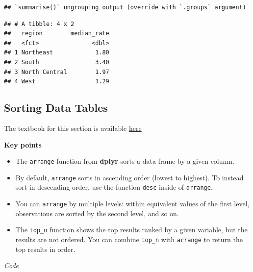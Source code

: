 \documentclass[
]{article}
\newenvironment{Shaded}{\begin{snugshade}}{\end{snugshade}}
\newcommand{\CommentTok}[1]{\textcolor[rgb]{0.56,0.35,0.01}{\textit{#1}}}
\newcommand{\DataTypeTok}[1]{\textcolor[rgb]{0.13,0.29,0.53}{#1}}
\newcommand{\DecValTok}[1]{\textcolor[rgb]{0.00,0.00,0.81}{#1}}
\newcommand{\KeywordTok}[1]{\textcolor[rgb]{0.13,0.29,0.53}{\textbf{#1}}}
\newcommand{\NormalTok}[1]{#1}
\newcommand{\OperatorTok}[1]{\textcolor[rgb]{0.81,0.36,0.00}{\textbf{#1}}}
\newcommand{\StringTok}[1]{\textcolor[rgb]{0.31,0.60,0.02}{#1}}
\providecommand{\tightlist}{%
  \setlength{\itemsep}{0pt}\setlength{\parskip}{0pt}}
\begin{document}
\begin{verbatim}
## `summarise()` ungrouping output (override with `.groups` argument)
\end{verbatim}

\begin{verbatim}
## # A tibble: 4 x 2
##   region        median_rate
##   <fct>               <dbl>
## 1 Northeast            1.80
## 2 South                3.40
## 3 North Central        1.97
## 4 West                 1.29
\end{verbatim}

\hypertarget{sorting-data-tables}{%
\subsection{Sorting Data Tables}\label{sorting-data-tables}}

The textbook for this section is available
\href{https://rafalab.github.io/dsbook/tidyverse.html\#sorting-data-frames}{here}

\textbf{Key points}

\begin{itemize}
\tightlist
\item
  The \texttt{arrange} function from \textbf{dplyr} sorts a data frame
  by a given column.
\item
  By default, \texttt{arrange} sorts in ascending order (lowest to
  highest). To instead sort in descending order, use the function
  \texttt{desc} inside of \texttt{arrange}.
\item
  You can \texttt{arrange} by multiple levels: within equivalent values
  of the first level, observations are sorted by the second level, and
  so on.
\item
  The \texttt{top\_n} function shows the top results ranked by a given
  variable, but the results are not ordered. You can combine
  \texttt{top\_n} with \texttt{arrange} to return the top results in
  order.
\end{itemize}

\emph{Code}

\begin{Shaded}
\end{Shaded}
\end{document}
